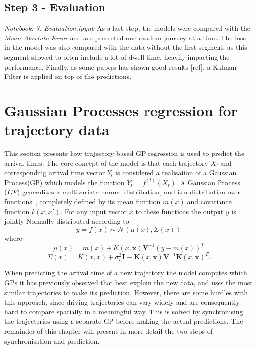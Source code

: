 \subsection{Step 3 - Evaluation}
\textit{Notebook: 3. Evaluation.ipynb}
\newline
As a last step, the models were compared with the \textit{Mean Absolute Error} and are presented one random journey at a time. The loss in the model was also compared with the data without the first segment, as this segment showed to often include a lot of dwell time, heavily impacting the performance. Finally, as some papers has shown good results [ref], a Kalman Filter is applied on top of the predictions.

\section{Gaussian Processes regression for trajectory data}
This section presents how trajectory based GP regression is used to predict the arrival times. The core concept of the model is that each trajectory $X_t$ and corresponding arrival time vector $Y_t$ is considered a realisation of a Gaussian Process(GP) which models the function $Y_t = f^{(t)}(X_t)$. A Gaussian Process (\textit{GP}) generalises a multivariate normal distribution, and is a distribution over functions~\cite{Rasmussen-Williams-2006}, completely defined by its mean function $m(x)$ and covariance function $k(x, x')$. For any input vector $x$ to these functions the output $y$ is jointly Normally distributed according to
\begin{equation}
  \label{eq:gp}
  y = f(x) \sim \mathcal{N}(\mu(x), \Sigma(x))
\end{equation}
where
\begin{equation}
  \label{eq:gp-mean-function}
  \mu(x) = m(x) + K(x, \textbf{x})\textbf{V}^{-1}{(y-m(x))}^{T}
\end{equation}
\begin{equation}
  \label{eq:gp-covariance-function}
  \Sigma(x) = K(x, x) + \sigma^{2}_n\textbf{I} - \textbf{K}(x, \textbf{x})\textbf{V}^{-1}{\textbf{K}(x, \textbf{x})}^{T}.
\end{equation}

When predicting the arrival time of a new trajectory the model computes which GPs it has previously observed that best explain the new data, and uses the most similar trajectories to make its prediction. However, there are some hurdles with this approach, since driving trajectories can vary widely and are consequently hard to compare spatially in a meaningful way. This is solved by synchronising the trajectories using a separate GP before making the actual predictions. The remainder of this chapter will present in more detail the two steps of synchronisation and prediction.


